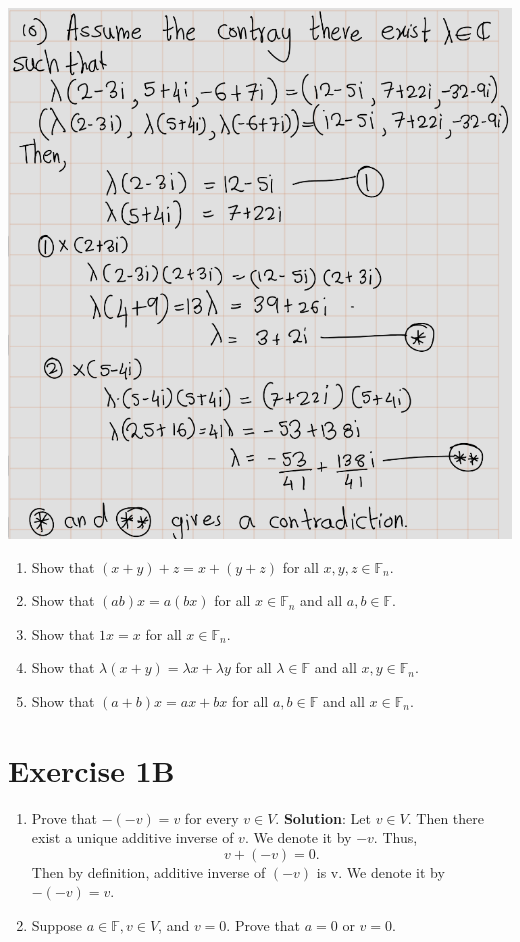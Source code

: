 \documentclass[
]{book}
\theoremstyle{definition}
\theoremstyle{definition}
\theoremstyle{definition}
\theoremstyle{definition}
\theoremstyle{remark}
\begin{document}
\includegraphics[width=10.36in]{fig/Ex1A/Ex10}

\begin{enumerate}
\def\labelenumi{\arabic{enumi}.}
\setcounter{enumi}{10}
\item
  Show that \((x + y) + z = x + (y + z)\) for all \(x, y, z \in \mathbb{F}_n\).
\item
  Show that \((ab)x = a(bx)\) for all \(x \in \mathbb{F}_n\) and all \(a, b \in \mathbb{F}\).
\item
  Show that \(1x = x\) for all \(x \in \mathbb{F}_n\).
\item
  Show that \(\lambda(x + y) = \lambda x + \lambda y\) for all \(\lambda \in \mathbb{F}\) and all \(x, y \in \mathbb{F}_n\).
\item
  Show that \((a + b)x = ax + bx\) for all \(a, b \in \mathbb{F}\) and all \(x \in \mathbb{F}_n\).
\end{enumerate}

\section{Exercise 1B}\label{exercise-1b}

\begin{enumerate}
\def\labelenumi{\arabic{enumi}.}
\item
  Prove that \(−(−v) = v\) for every \(v\in V\).
  \textbf{Solution}:
  Let \(v\in V\). Then there exist a unique additive inverse of \(v\). We denote it by \(-v\). Thus,
  \[v+(-v)=0.\] Then by definition, additive inverse of \((-v)\) is v. We denote it by \(-(-v)=v\).
\item
  Suppose \(a \in \mathbb{F} ,v\in V\), and \(v= 0\). Prove that \(a=0\) or \(v=0\).
\end{enumerate}
\end{document}
